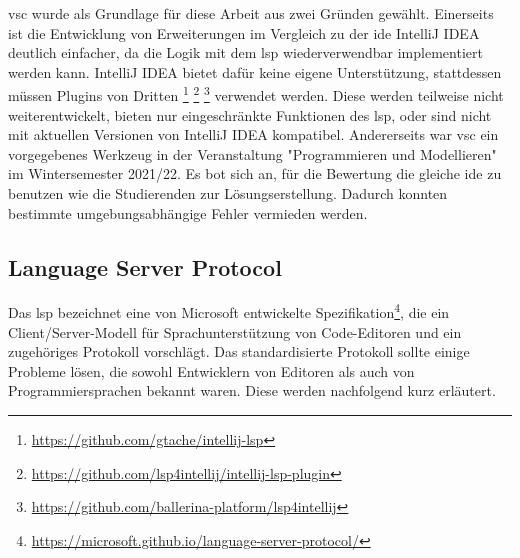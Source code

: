 \ac{vsc} wurde als Grundlage für diese Arbeit aus zwei Gründen gewählt.
Einerseits ist die Entwicklung von Erweiterungen im Vergleich zu der \ac{ide} IntelliJ IDEA deutlich einfacher, da die Logik mit dem \ac{lsp} wiederverwendbar implementiert werden kann.
IntelliJ IDEA bietet dafür keine eigene Unterstützung, stattdessen müssen Plugins von Dritten
\footnote{\url{https://github.com/gtache/intellij-lsp}}
\footnote{\url{https://github.com/lsp4intellij/intellij-lsp-plugin}}
\footnote{\url{https://github.com/ballerina-platform/lsp4intellij}}
verwendet werden.
Diese werden teilweise nicht weiterentwickelt, bieten nur eingeschränkte Funktionen des \ac{lsp}, oder sind nicht mit aktuellen Versionen von IntelliJ IDEA kompatibel.
Andererseits war \ac{vsc} ein vorgegebenes Werkzeug in der Veranstaltung "Programmieren und Modellieren" im Wintersemester 2021/22.
Es bot sich an, für die Bewertung die gleiche \ac{ide} zu benutzen wie die Studierenden zur Lösungserstellung.
Dadurch konnten bestimmte umgebungsabhängige Fehler vermieden werden.

\subsection{Language Server Protocol}\label{subsec:language-server-protocol}

Das \ac{lsp} bezeichnet eine von Microsoft entwickelte Spezifikation\footnote{\url{https://microsoft.github.io/language-server-protocol/}}, die ein Client/Server-Modell für Sprachunterstützung von Code-Editoren und ein zugehöriges Protokoll vorschlägt.
Das standardisierte Protokoll sollte einige Probleme lösen, die sowohl Entwicklern von Editoren als auch von Programmiersprachen bekannt waren.
Diese werden nachfolgend kurz erläutert.

